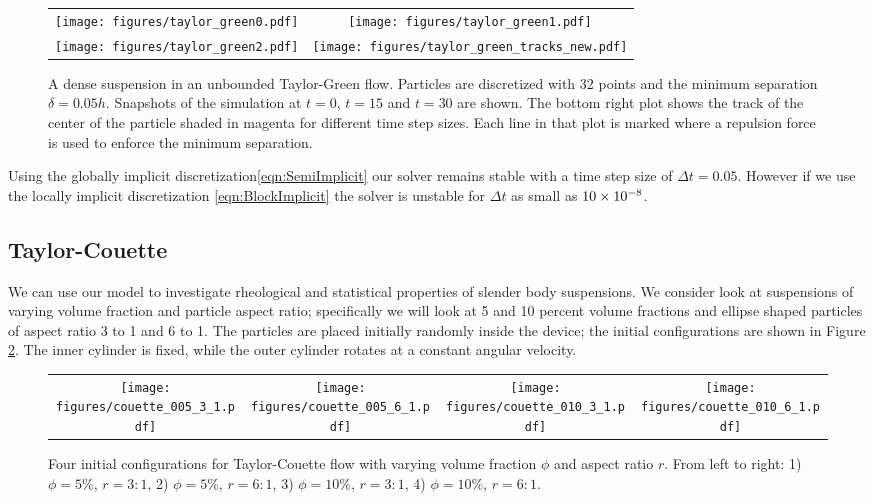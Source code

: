 \documentclass[preprint, 10pt]{elsarticle}
\begin{document}
\begin{figure}[!h]
\begin{center}
\begin{tabular}{c c }
\texttt{[image: figures/taylor\_green0.pdf]} &
\texttt{[image: figures/taylor\_green1.pdf]}\\
\texttt{[image: figures/taylor\_green2.pdf]} &
 \texttt{[image: figures/taylor\_green\_tracks\_new.pdf]}
\end{tabular}
\end{center}
\caption{A dense suspension in an unbounded Taylor-Green flow. Particles are
discretized with 32 points and the minimum separation $\delta=0.05h$.
Snapshots of the simulation at $t=0$, $t=15$ and $t=30$ are shown. The bottom
right plot shows the track of the center of the particle shaded in magenta for
different time step sizes. Each line in that plot is marked where a repulsion
force is used to enforce the minimum separation. }\label{fig:taylor_green}
\end{figure}

Using the globally implicit discretization\eqref{eqn:SemiImplicit} our solver remains stable with a time step size of $\Delta t=0.05$. However if we use the locally implicit discretization \eqref{eqn:BlockImplicit} the solver is unstable for $\Delta t$ as small as $10\times 10^{-8}$.

\FloatBarrier
\subsection{Taylor-Couette}

We can use our model to investigate rheological and statistical properties of
slender body suspensions. We consider look at suspensions of varying volume
fraction and particle aspect ratio; specifically we will look at 5 and 10
percent volume fractions and ellipse shaped particles of aspect ratio 3 to 1 and 6 to 1. The particles are placed initially randomly inside the device; the
initial configurations are shown in Figure \ref{fig:couette_setup}. The inner
cylinder is fixed, while the outer cylinder rotates at a constant angular
velocity.

\begin{figure}[!h]
\begin{center}
\begin{tabular}{c c c c}
\texttt{[image: figures/couette\_005\_3\_1.pdf]} &
\texttt{[image: figures/couette\_005\_6\_1.pdf]} &
\texttt{[image: figures/couette\_010\_3\_1.pdf]} &
\texttt{[image: figures/couette\_010\_6\_1.pdf]}
\end{tabular}
\end{center}
\caption{Four initial configurations for Taylor-Couette flow with varying volume fraction $\phi$ and aspect ratio $r$. From left to right: 1) $\phi=5\%$, $r =
3:1$, 2) $\phi=5\%$, $r=6:1$, 3) $\phi=10\%$, $r=3:1$, 4) $\phi=10\%$,
$r=6:1$.}\label{fig:couette_setup}
\end{figure}
\end{document}
